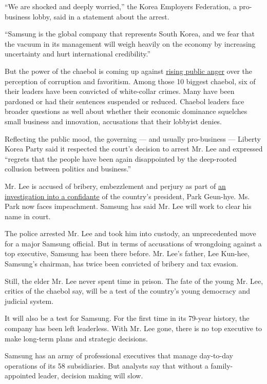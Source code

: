 ``We are shocked and deeply worried,'' the Korea Employers Federation, a
pro-business lobby, said in a statement about the arrest.

``Samsung is the global company that represents South Korea, and we fear
that the vacuum in its management will weigh heavily on the economy by
increasing uncertainty and hurt international credibility.''

But the power of the chaebol is coming up against
\href{https://www.nytimes3xbfgragh.onion/2017/01/02/world/asia/south-korea-park-geun-hye-samsung.html}{rising
public anger} over the perception of corruption and favoritism. Among
those 10 biggest chaebol, six of their leaders have been convicted of
white-collar crimes. Many have been pardoned or had their sentences
suspended or reduced. Chaebol leaders face broader questions as well
about whether their economic dominance squelches small business and
innovation, accusations that their lobbyist denies.

Reflecting the public mood, the governing --- and usually pro-business
--- Liberty Korea Party said it respected the court's decision to arrest
Mr. Lee and expressed ``regrets that the people have been again
disappointed by the deep-rooted collusion between politics and
business.''

Mr. Lee is accused of bribery, embezzlement and perjury as part of
\href{https://www.nytimes3xbfgragh.onion/2017/01/02/world/asia/south-korea-park-geun-hye-samsung.html}{an
investigation into a confidante} of the country's president, Park
Geun-hye. Ms. Park now faces impeachment. Samsung has said Mr. Lee will
work to clear his name in court.

The police arrested Mr. Lee and took him into custody, an unprecedented
move for a major Samsung official. But in terms of accusations of
wrongdoing against a top executive, Samsung has been there before. Mr.
Lee's father, Lee Kun-hee, Samsung's chairman, has twice been convicted
of bribery and tax evasion.

Still, the elder Mr. Lee never spent time in prison. The fate of the
young Mr. Lee, critics of the chaebol say, will be a test of the
country's young democracy and judicial system.

It will also be a test for Samsung. For the first time in its 79-year
history, the company has been left leaderless. With Mr. Lee gone, there
is no top executive to make long-term plans and strategic decisions.

Samsung has an army of professional executives that manage day-to-day
operations of its 58 subsidiaries. But analysts say that without a
family-appointed leader, decision making will slow.

